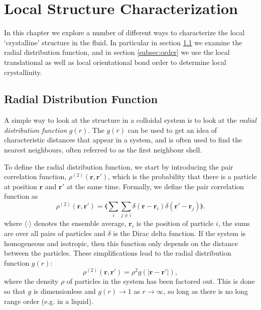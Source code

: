 \documentclass[thesis]{subfiles}
\begin{document}
\newpage

\section{Local Structure Characterization}

In this chapter we explore a number of different ways to characterize the local `crystalline' structure in the fluid. In particular in section \ref{subsec:rdf} we examine the radial distribution function, and in section \ref{subsec:order} we use the local translational as well as local orientational bond order to determine local crystallinity.

\subsection{Radial Distribution Function} \label{subsec:rdf}

A simple way to look at the structure in a colloidal system is to look at the \emph{radial distribution function} $g(r)$.  The $g(r)$ can be used to get an idea of characteristic distances that appear in a system, and is often used to find the nearest neighbours, often referred to as the first neighbour shell. 

To define the radial distribution function, we start by introducing the pair correlation function, 
 $\rho^{(2)}(\bm r, \bm r')$,  which is the probability that there is a particle at position $\bm r$ and $\bm r'$ at the same time. Formally, we define the pair correlation function as 
\begin{equation}
\rho^{(2)}(\bm r, \bm r') = \llangle \sum_i \sum_{j \neq i} \delta(\bm r - \bm r_i) \delta(\bm r' - \bm r_j) \rrangle.
\end{equation}
where $\langle \cdot \rangle$ denotes the ensemble average, $\bm r_i$ is the position of particle $i$, the sums are over all pairs of particles and $\delta$ is the Dirac delta function.
If the system is homogeneous and isotropic, then this function only depends on the distance between the particles. These simplifications lead to the radial distribution function $g(r)$:
\begin{equation}
\rho^{(2)}(\bm r, \bm r') = \rho^2 g(|\bm r - \bm r'|), \label{eq:gofr}
\end{equation}
where the density $\rho$ of particles in the system has been factored out. This is done so that $g$ is dimensionless and $g(r) \rightarrow 1$ as $r \rightarrow \infty$, so long as there is no long range order (e.g. in a liquid).
\end{document}
